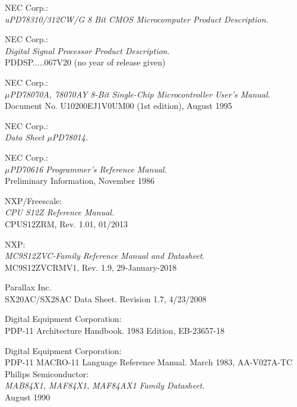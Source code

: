  NEC Corp.: \\
		{\em uPD78310/312CW/G 8 Bit CMOS Microcomputer Product
                 Description.\/}

 NEC Corp.: \\
                {\em Digital Signal Processor Product Description.\/} \\
                PDDSP.....067V20 (no year of release given)

 NEC Corp.: \\
                {\em $\mu$PD78070A, 78070AY 8-Bit Single-Chip Microcontroller
                 User's Manual.\/} \\
                Document No. U10200EJ1V0UM00 (1st edition), August 1995

 NEC Corp.: \\
                  {\em Data Sheet $\mu$PD78014.\/}

 NEC Corp.: \\
                {\em $\mu$PD70616 Programmer's Reference Manual.\/} \\
                Preliminary Information, November 1986

 NXP/Freescale: \\
                {\em CPU S12Z Reference Manual.} \\
                CPUS12ZRM, Rev. 1.01, 01/2013

 NXP: \\
                {\em MC9S12ZVC-Family Reference Manual and Datasheet.} \\
                MC9S12ZVCRMV1, Rev. 1.9, 29-January-2018

 Parallax Inc. \\
                  { SX20AC/SX28AC Data Sheet.}
                  Revision 1.7, 4/23/2008

 Digital Equipment Corporation: \\
                  { PDP-11 Architecture Handbook.}
                  1983 Edition, EB-23657-18

 Digital Equipment Corporation: \\
                  { PDP-11 MACRO-11 Language Reference Manual.}
                  March 1983, AA-V027A-TC
 Philips Semiconductor: \\
                 {\em MAB84X1, MAF84X1, MAF84AX1 Family Datasheet.} \\
                 August 1990

